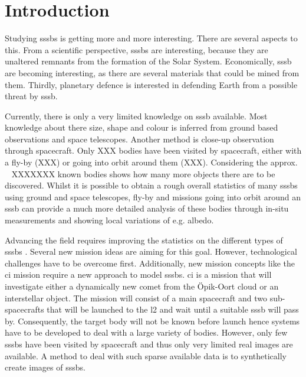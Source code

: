 \section{Introduction} \label{sec:introduction}
Studying \gls{sssb}s is getting more and more interesting. There are several aspects to this. From a scientific perspective, \gls{sssb}s are interesting, because they are unaltered remnants from the formation of the Solar System. Economically, \gls{sssb} are becoming interesting, as there are several materials that could be mined from them. Thirdly, planetary defence is interested in defending Earth from a possible threat by \gls{sssb}.

Currently, there is only a very limited knowledge on \gls{sssb} available. Most knowledge about there size, shape and colour is inferred from ground based observations and space telescopes. Another method is close-up observation through spacecraft. Only {\color{red}XXX} bodies have been visited by spacecraft, either with a fly-by {\color{red}(XXX)} or going into orbit around them {\color{red}(XXX)}. Considering the approx. ~{\color{red} XXXXXXX} known bodies shows how many more objects there are to be discovered. Whilst it is possible to obtain a rough overall statistics of many \gls{sssb}s using ground and space telescopes, fly-by and missions going into orbit around an \gls{sssb} can provide a much more detailed analysis of these bodies through in-situ measurements and showing local variations of e.g. albedo.

Advancing the field requires improving the statistics on the different types of \gls{sssb}s \cite{Pajusalu2019CharacterizationMapping}. Several new mission ideas are aiming for this goal. However, technological challenges have to be overcome first. Additionally, new mission concepts like the \gls{ci} mission require a new approach to model \gls{sssb}s. \gls{ci} is a mission that will investigate either a dynamically new comet from the Öpik-Oort cloud or an interstellar object. The mission will consist of a main spacecraft and two sub-spacecrafts that will be launched to the \gls{l2} and wait until a suitable \gls{sssb} will pass by. Consequently, the target body will not be known before launch hence systems have to be developed to deal with a large variety of bodies. However, only few \gls{sssb}s have been visited by spacecraft and thus only very limited real images are available. A method to deal with such sparse available data is to synthetically create images of \gls{sssb}s.

